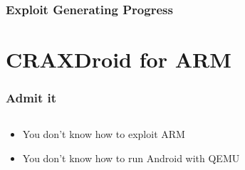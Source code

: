 \documentclass[t,xcolor=table,usenames,dvipsnames]{beamer}
\begin{document}
\begin{frame}
    \frametitle{Exploit Generating Progress}
    
\end{frame}

\section{CRAXDroid for ARM}
\begin{frame}
    \sectionpage
\end{frame}

\begin{frame}
    \frametitle{Admit it}
    \begin{columns}
        \begin{column}{7.5cm}
            \begin{itemize}
                \item{You don't know how to exploit ARM}
                \item{You don't know how to run Android with QEMU}
            \end{itemize}
        \end{column}
        \begin{column}{4.5cm}
            \begin{figure}
            \end{figure}
        \end{column}
    \end{columns}
\end{frame}
\end{document}
